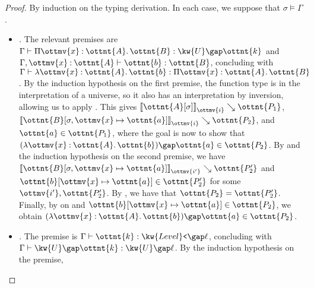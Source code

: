 \documentclass[a4paper,UKenglish,cleveref,autoref,thm-restate]{lipics-v2021}
\begin{document}
\begin{proof}
  By induction on the typing derivation.
  In each case, we suppose that $ \sigma  \vDash  \Gamma $.
  \begin{itemize}[topsep=0pt]
    \item \textit{.}
      The relevant premises are $ \Gamma  \vdash   \Pi  \ottmv{x}  \mathbin{:}  \ottnt{A}  \mathpunct{.}  \ottnt{B}   \mathrel{:}   \kw{U} \gap  \ottnt{k}  $ and $  \Gamma ,  \ottmv{x}  \mathbin{:}  \ottnt{A}   \vdash  \ottnt{b}  \mathrel{:}  \ottnt{B} $,
      concluding with $ \Gamma  \vdash   \lambda  \ottmv{x}  \mathbin{:}  \ottnt{A}  \mathpunct{.}  \ottnt{b}   \mathrel{:}   \Pi  \ottmv{x}  \mathbin{:}  \ottnt{A}  \mathpunct{.}  \ottnt{B}  $.
      By the induction hypothesis on the first premise,
      the function type is in the interpretation of a universe,
      so it also has an interpretation by inversion,
      allowing us to apply .
      This gives $ \mathopen{\llbracket}   \ottnt{A} [  \sigma  ]   \mathclose{\rrbracket}_{ \ottmv{i} } \searrow  \ottnt{P_{{\mathrm{1}}}} $, $ \mathopen{\llbracket}   \ottnt{B} [   \sigma ,  \ottmv{x}  \mapsto  \ottnt{a}   ]   \mathclose{\rrbracket}_{ \ottmv{i} } \searrow  \ottnt{P_{{\mathrm{2}}}} $, and $ \ottnt{a}  \in  \ottnt{P_{{\mathrm{1}}}} $,
      where the goal is now to show that $   (  \lambda  \ottmv{x}  \mathbin{:}  \ottnt{A}  \mathpunct{.}  \ottnt{b}  )   \gap  \ottnt{a}   \in  \ottnt{P_{{\mathrm{2}}}} $.
      By  and the induction hypothesis on the second premise,
      we have $ \mathopen{\llbracket}   \ottnt{B} [   \sigma ,  \ottmv{x}  \mapsto  \ottnt{a}   ]   \mathclose{\rrbracket}_{ \ottmv{i'} } \searrow  \ottnt{P'_{{\mathrm{2}}}} $ and $  \ottnt{b} [  \ottmv{x}  \mapsto  \ottnt{a}  ]   \in  \ottnt{P'_{{\mathrm{2}}}} $ for some $\ottmv{i'}, \ottnt{P'_{{\mathrm{2}}}}$.
      By , we have that $\ottnt{P_{{\mathrm{2}}}} = \ottnt{P'_{{\mathrm{2}}}}$.
      Finally, by  on  and $  \ottnt{b} [  \ottmv{x}  \mapsto  \ottnt{a}  ]   \in  \ottnt{P_{{\mathrm{2}}}} $,
      we obtain $   (  \lambda  \ottmv{x}  \mathbin{:}  \ottnt{A}  \mathpunct{.}  \ottnt{b}  )   \gap  \ottnt{a}   \in  \ottnt{P_{{\mathrm{2}}}} $.
    \item \textit{.}
      The premise is $ \Gamma  \vdash  \ottnt{k}  \mathrel{:}   \kw{Level}\texttt{<} \gap  \ell  $,
      concluding with $ \Gamma  \vdash   \kw{U} \gap  \ottnt{k}   \mathrel{:}   \kw{U} \gap  \ell  $.
      By the induction hypothesis on the premise,

\end{itemize}
\end{proof}
\end{document}
